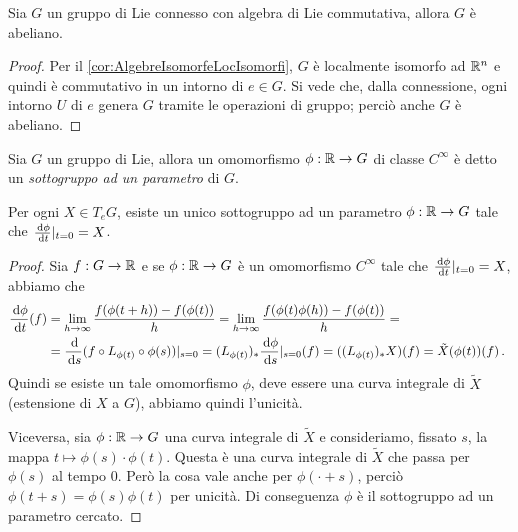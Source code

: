 \begin{corollary}
	Sia $G$ un gruppo di Lie connesso con algebra di Lie commutativa, allora $G$ è abeliano.
\end{corollary}
\begin{proof}
	Per il \cref{cor:AlgebreIsomorfeLocIsomorfi}, $G$ è localmente isomorfo ad $\mathbb R^n$ e quindi è commutativo in un intorno di $e \in G$. Si vede che, dalla connessione, ogni intorno $U$ di $e$ genera $G$ tramite le operazioni di gruppo; perciò anche $G$ è abeliano.
\end{proof}


\begin{definition} 
	Sia $G$ un gruppo di Lie, allora un omomorfismo $\phi : \mathbb R \to G$ di classe $C^\infty$ è detto un \emph{sottogruppo ad un parametro} di $G$.
\end{definition}


\begin{corollary}
	Per ogni $X \in T_eG$, esiste un unico sottogruppo ad un parametro $\phi: \mathbb R \to G$ tale che $\frac{\,\mathrm d\phi}{\,\mathrm d t}|_{t=0} = X$.
\end{corollary}
\begin{proof}
	Sia $f:G\to \mathbb R$ e se $\phi: \mathbb R \to G$ è un omomorfismo $C^\infty$ tale che $\frac{\,\mathrm d\phi}{\,\mathrm d t}|_{t=0} = X$, abbiamo che
	\begin{align*}
		\frac{\,\mathrm d\phi}{\,\mathrm d t}(f) &= \lim_{h\to\infty} \frac{f(\phi(t+h))-f(\phi(t))}{h} = \lim_{h\to\infty} \frac{f(\phi(t)\phi(h))-f(\phi(t))}{h} =\\
		&=\frac{\,\mathrm d}{\,\mathrm d s} (f\circ L_{\phi(t)} \circ \phi(s)) |_{s=0} = (L_{\phi(t)})_* \frac{\,\mathrm d\phi}{\,\mathrm d s}|_{s=0} (f) = (( L_{\phi(t)} )_* X) (f) = \tilde X(\phi(t)) (f) \, \text{. }
	\end{align*}
	Quindi se esiste un tale omomorfismo $\phi$, deve essere una curva integrale di $\tilde X$ (estensione di $X$ a $G$), abbiamo quindi l'unicità.
	
	Viceversa, sia $\phi: \mathbb R \to G$ una curva integrale di $\tilde X$ e consideriamo, fissato $s$, la mappa $t\mapsto \phi(s)\cdot \phi(t)$.
	Questa è una curva integrale di $\tilde X$ che passa per $\phi(s)$ al tempo 0.
	Però la cosa vale anche per $\phi(\cdot + s)$, perciò $\phi(t+s) = \phi(s) \phi(t)$ per unicità.
	Di conseguenza $\phi$ è il sottogruppo ad un parametro cercato.
\end{proof}

